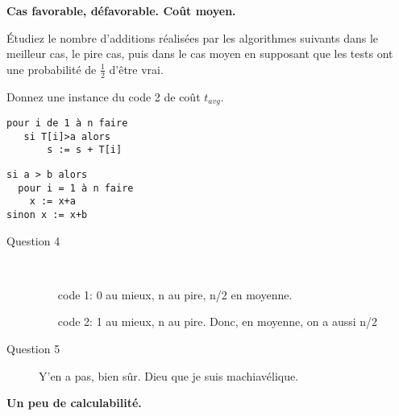 \documentclass[10pt]{article}\usepackage[correction]{esial}
\begin{document}
\medskip
\Exercice \textbf{Cas favorable, défavorable. Coût moyen.}


\vspace{-.2\baselineskip}\noindent\begin{minipage}{.65\linewidth}

  \Question Étudiez le nombre d'additions réalisées par les
  algorithmes suivants dans le meilleur cas, le pire cas, puis dans le
  cas moyen en supposant que les tests ont une probabilité de
  $\frac{1}{2}$ d'être vrai.

  \Question Donnez une instance du code 2 de coût $t_{avg}$.

\end{minipage}\hfill\begin{minipage}{.3\linewidth}
\begin{Verbatim}[label=code 1]
pour i de 1 à n faire
   si T[i]>a alors
       s := s + T[i]  
\end{Verbatim}

\begin{Verbatim}[label=code 2]
si a > b alors 
  pour i = 1 à n faire 
    x := x+a 
sinon x := x+b
\end{Verbatim}
\end{minipage}


\begin{Reponse}
  \begin{description}
  \item[Question 4] ~
    \begin{enumerate}
    \item[code 1:] 0 au mieux, n au pire, n/2 en moyenne. 
    \item[code 2:] 1 au mieux, n au pire. Donc, en moyenne, on a aussi n/2
    \end{enumerate}
  \item[Question 5] Y'en a pas, bien sûr. Dieu que je suis machiavélique.
  \end{description}
\end{Reponse}

\Exercice \textbf{Un peu de calculabilité.}  
\end{document}

